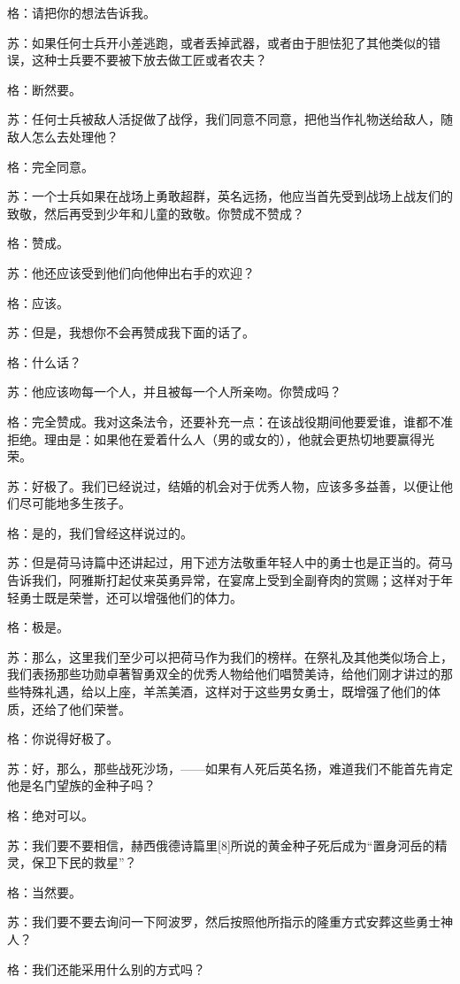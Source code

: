 \documentclass[12pt,oneside]{book}
\begin{document}
格：请把你的想法告诉我。

苏：如果任何士兵开小差逃跑，或者丢掉武器，或者由于胆怯犯了其他类似的错误，这种士兵要不要被下放去做工匠或者农夫？

格：断然要。

苏：任何士兵被敌人活捉做了战俘，我们同意不同意，把他当作礼物送给敌人，随敌人怎么去处理他？

格：完全同意。

苏：一个士兵如果在战场上勇敢超群，英名远扬，他应当首先受到战场上战友们的致敬，然后再受到少年和儿童的致敬。你赞成不赞成？

格：赞成。

苏：他还应该受到他们向他伸出右手的欢迎？

格：应该。

苏：但是，我想你不会再赞成我下面的话了。

格：什么话？

苏：他应该吻每一个人，并且被每一个人所亲吻。你赞成吗？

格：完全赞成。我对这条法令，还要补充一点：在该战役期间他要爱谁，谁都不准拒绝。理由是：如果他在爱着什么人（男的或女的），他就会更热切地要赢得光荣。

苏：好极了。我们已经说过，结婚的机会对于优秀人物，应该多多益善，以便让他们尽可能地多生孩子。

格：是的，我们曾经这样说过的。

苏：但是荷马诗篇中还讲起过，用下述方法敬重年轻人中的勇士也是正当的。荷马告诉我们，阿雅斯打起仗来英勇异常，在宴席上受到全副脊肉的赏赐；这样对于年轻勇士既是荣誉，还可以增强他们的体力。

格：极是。

苏：那么，这里我们至少可以把荷马作为我们的榜样。在祭礼及其他类似场合上，我们表扬那些功勋卓著智勇双全的优秀人物给他们唱赞美诗，给他们刚才讲过的那些特殊礼遇，给以上座，羊羔美酒，这样对于这些男女勇士，既增强了他们的体质，还给了他们荣誉。

格：你说得好极了。

苏：好，那么，那些战死沙场，——如果有人死后英名扬，难道我们不能首先肯定他是名门望族的金种子吗？

格：绝对可以。

苏：我们要不要相信，赫西俄德诗篇里[8]所说的黄金种子死后成为“置身河岳的精灵，保卫下民的救星”？

格：当然要。

苏：我们要不要去询问一下阿波罗，然后按照他所指示的隆重方式安葬这些勇士神人？

格：我们还能采用什么别的方式吗？
\end{document}
